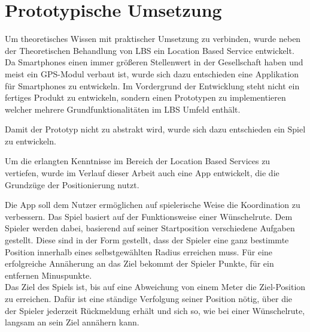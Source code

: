 \newpage
\section{Prototypische Umsetzung}

Um theoretisches Wissen mit praktischer Umsetzung zu verbinden, wurde neben der Theoretischen Behandlung von LBS ein Location Based Service entwickelt. Da Smartphones einen immer größeren Stellenwert in der Gesellschaft haben und meist ein GPS-Modul verbaut ist, wurde sich dazu entschieden eine Applikation für Smartphones zu entwickeln. Im Vordergrund der Entwicklung steht nicht ein fertiges Produkt zu entwickeln, sondern einen Prototypen zu implementieren welcher mehrere Grundfunktionalitäten im LBS Umfeld enthält.

Damit der Prototyp nicht zu abstrakt wird, wurde sich dazu entschieden ein Spiel zu entwickeln.


Um die erlangten Kenntnisse im Bereich der Location Based Services zu vertiefen, wurde im Verlauf dieser Arbeit auch eine App entwickelt, die die Grundzüge der Positionierung nutzt. 


Die App soll dem Nutzer ermöglichen auf spielerische Weise die Koordination zu verbessern. Das Spiel basiert auf der Funktionsweise einer Wünschelrute. Dem Spieler werden dabei, basierend auf seiner Startposition verschiedene Aufgaben gestellt. Diese sind in der Form gestellt, dass der Spieler eine ganz bestimmte Position innerhalb eines selbstgewählten Radius erreichen muss. Für eine erfolgreiche Annäherung an das Ziel bekommt der Spieler Punkte, für ein entfernen Minuspunkte.
\\
Das Ziel des Spiels ist, bis auf eine Abweichung von einem Meter die Ziel-Position zu erreichen. Dafür ist eine ständige Verfolgung seiner Position nötig, über die der Spieler jederzeit Rückmeldung erhält und sich so, wie bei einer Wünschelrute, langsam an sein Ziel annähern kann.









